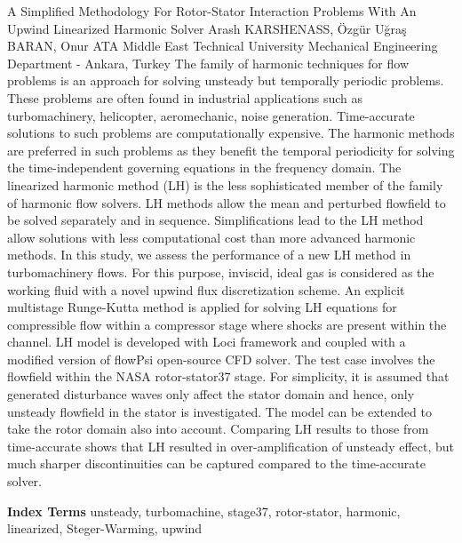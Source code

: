 
    \begin{abstract_online}{A Simplified Methodology For Rotor-Stator Interaction Problems With An Upwind Linearized Harmonic Solver}{%
        Arash KARSHENASS, Özgür Uğraş BARAN, Onur ATA}{%
        }{%
        Middle East Technical University Mechanical Engineering Department - Ankara, Turkey}
    The family of harmonic techniques for flow problems is an approach for solving unsteady but temporally periodic problems. These problems are often found in industrial applications such as turbomachinery, helicopter, aeromechanic, noise generation. Time-accurate solutions to such problems are computationally expensive. The harmonic methods are preferred in such problems as they benefit the temporal periodicity for solving the time-independent governing equations in the frequency domain. The linearized harmonic method (LH) is the less sophisticated member of the family of harmonic flow solvers. LH methods allow the mean and perturbed flowfield to be solved separately and in sequence. Simplifications lead to the LH method allow solutions with less computational cost than more advanced harmonic methods. In this study, we assess the performance of a new LH method in turbomachinery flows. For this purpose, inviscid, ideal gas is considered as the working fluid with a novel upwind flux discretization scheme. An explicit multistage Runge-Kutta method is applied for solving LH equations for compressible flow within a compressor stage where shocks are present within the channel. LH model is developed with Loci framework and coupled with a modified version of flowPsi open-source CFD solver. The test case involves the flowfield within the NASA rotor-stator37 stage. For simplicity, it is assumed that generated disturbance waves only affect the stator domain and hence, only unsteady flowfield in the stator is investigated. The model can be extended to take the rotor domain also into account. Comparing LH results to those from time-accurate shows that LH resulted in over-amplification of unsteady effect, but much sharper discontinuities can be captured compared to the time-accurate solver. 
    
            \textbf{Index Terms} \newline{}unsteady, turbomachine, stage37, rotor-stator, harmonic, linearized, Steger-Warming, upwind
    \end{abstract_online}
    